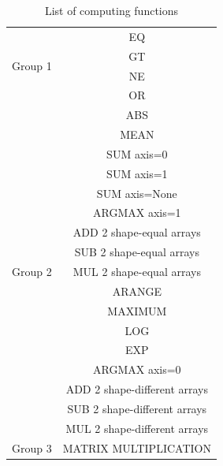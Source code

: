 \begin{table}[]
\centering
\caption{List of computing functions}
\label{my-label}
\begin{tabular}{|c|c|}
\hline
\multirow{4}{*}{Group 1} 					& EQ \\ \cline{2-2} 
\multirow{4}{*}{}                         	& GT \\ \cline{2-2} 
\multirow{4}{*}{}                         	& NE \\ \cline{2-2} 
\multirow{4}{*}{}                         	& OR \\ \hline

\multirow{17}{*}{Group 2} 	 				& ABS \\ \cline{2-2}
\multirow{17}{*}{} 							& MEAN \\ \cline{2-2}
\multirow{17}{*}{} 							& SUM axis=0 \\ \cline{2-2}
\multirow{17}{*}{} 							& SUM axis=1 \\ \cline{2-2}
\multirow{17}{*}{} 			 				& SUM axis=None \\ \cline{2-2}
\multirow{17}{*}{} 			 				& ARGMAX axis=1 \\ \cline{2-2}
\multirow{17}{*}{} 							& ADD 2 shape-equal arrays  \\ \cline{2-2}
\multirow{17}{*}{} 							& SUB 2 shape-equal arrays\\ \cline{2-2}
\multirow{17}{*}{} 							& MUL 2 shape-equal arrays \\ \cline{2-2}
\multirow{17}{*}{} 				 			& ARANGE \\ \cline{2-2}
\multirow{17}{*}{} 							& MAXIMUM \\ \cline{2-2}
\multirow{17}{*}{} 							& LOG \\ \cline{2-2}
\multirow{17}{*}{}		 					& EXP \\ \cline{2-2}
\multirow{17}{*}{} 							& ARGMAX axis=0 \\ \cline{2-2}
\multirow{17}{*}{}  							& ADD 2 shape-different arrays \\ \cline{2-2}
\multirow{17}{*}{} 		 					& SUB 2 shape-different arrays\\ \cline{2-2}
\multirow{17}{*}{} 		 					& MUL 2 shape-different arrays\\ \hline

Group 3 										& MATRIX MULTIPLICATION \\ \hline
\end{tabular}
\end{table}


